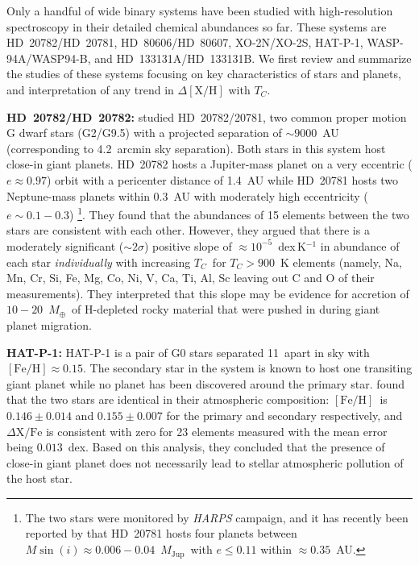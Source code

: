\documentclass[manuscript]{aastex6}
\newcommand{\project}[1]{\textsl{#1}}
\newcommand*\elem[1]{\ensuremath{\mathrm{#1}}}
\newcommand*\elemH[1]{\ensuremath{[\mathrm{#1}/\elem{H}]}}
\newcommand*{\feh}{\ensuremath{\elemH{Fe}}}
\newcommand{\Tcondens}{\ensuremath{T_C}}
\newcommand{\mearth}{\ensuremath{M_\oplus}}
\newcommand{\mjupiter}{\ensuremath{M_\mathrm{Jup}}}
\begin{document}
Only a handful of wide binary systems have been studied with high-resolution
spectroscopy in their detailed chemical abundances so far.
These systems are HD~20782/HD~20781, HD~80606/HD~80607, XO-2N/XO-2S, HAT-P-1,
WASP-94A/WASP94-B, and HD~133131A/HD~133131B.
We first review and summarize the studies of these systems focusing on key
characteristics of stars and planets, and interpretation of any trend in
$\Delta\elemH{X}$ with \Tcondens.

{\bf HD~20782/HD~20782:} 
\citealt{Mack:2014aa} studied HD~20782/20781, two common proper motion G dwarf
stars (G2/G9.5) with a projected separation of $\sim9000$~AU (corresponding to
4.2~arcmin sky separation). Both stars in this system host close-in giant
planets.
HD~20782 hosts a Jupiter-mass planet on a very eccentric ($e\approx 0.97$)
orbit with a pericenter distance of 1.4~AU while HD~20781 hosts two
Neptune-mass planets within 0.3~AU with moderately high eccentricity
($e\sim0.1-0.3$) \footnote{
  The two stars were monitored by \project{HARPS}
  campaign, and it has recently been reported by \citealt{} that HD~20781 hosts
  four planets between $M\sin(i)\approx 0.006-0.04$~\mjupiter\ with $e \le
  0.11$ within $\approx 0.35$~AU.}.
They found that the abundances of 15 elements between the two stars are
consistent with each other.
However, they argued that there is a moderately significant ($\sim 2\sigma$)
positive slope of $\approx 10^{-5}$~dex\,K$^{-1}$ in abundance of each star
{\it individually} with increasing \Tcondens\ for $\Tcondens>900$~K elements
(namely, Na, Mn, Cr, Si, Fe, Mg, Co, Ni, V, Ca, Ti, Al, Sc leaving out C and O
of their measurements).
They interpreted that this slope may be evidence for accretion of
$10-20$~\mearth\ of H-depleted rocky material that were pushed in during giant
planet migration.

{\bf HAT-P-1:}
HAT-P-1 is a pair of G0 stars separated 11\arcsec\ apart in sky
with $\feh\approx0.15$.
The secondary star in the system is known to host one transiting giant planet
while no planet has been discovered around the primary star.
\citealt{Liu:2014aa} found that the two stars are identical in their
atmospheric composition: \feh\ is $0.146 \pm 0.014$ and $0.155 \pm 0.007$ for
the primary and secondary respectively, and $\Delta\elem{X}/\elem{Fe}$ is
consistent with zero for 23 elements measured with the mean error being
$0.013$~dex.
Based on this analysis, they concluded that the presence of close-in giant planet
does not necessarily lead to stellar atmospheric pollution of the host star.
\end{document}

